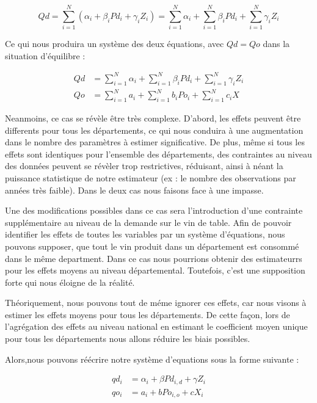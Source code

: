 \documentclass[11pt,]{article}
\begin{document}
\begin{equation*}
    Qd = \sum_{i = 1}^{N} ( \alpha_i + \beta_i Pd_i + \gamma_i Z_i ) = \sum_{i = 1}^{N} \alpha_i + \sum_{i = 1}^{N} \beta_i Pd_i + \sum_{i = 1}^{N} \gamma_i Z_i
\end{equation*}

Ce qui nous produira un système des deux équations, avec \(Qd = Qo\)
dans la situation d'équilibre :

\begin{align*}
    Qd & = \sum_{i = 1}^{N} \alpha_i + \sum_{i = 1}^{N} \beta_i Pd_i + \sum_{i = 1}^{N} \gamma_i Z_i \\
    Qo & = \sum_{i = 1}^{N} a_i + \sum_{i = 1}^{N} b_i Po_i + \sum_{i = 1}^{N} c_i X
\end{align*}

Neanmoins, ce cas se révèle être très complexe. D'abord, les effets
peuvent être differents pour tous les départements, ce qui nous conduira
à une augmentation dans le nombre des paramètres à estimer
significative. De plus, même si tous les effets sont identiques pour
l'ensemble des départements, des contraintes au niveau des données
peuvent se révèler trop restrictives, réduisant, ainsi à néant la
puissance statistique de notre estimateur (ex : le nombre des
observations par années très faible). Dans le deux cas nous faisons face
à une impasse.

Une des modifications possibles dans ce cas sera l'introduction d'une
contrainte supplémentaire au niveau de la demande sur le vin de table.
Afin de pouvoir identifier les effets de toutes les variables par un
système d'équations, nous pouvons supposer, que tout le vin produit dans
un département est consommé dans le même department. Dans ce cas nous
pourrions obtenir des estimateurrs pour les effets moyens au niveau
départemental. Toutefois, c'est une supposition forte qui nous éloigne
de la réalité.

Théoriquement, nous pouvons tout de méme ignorer ces effets, car nous
visons à estimer les effets moyens pour tous les départements. De cette
façon, lors de l'agrégation des effets au niveau national en estimant le
coefficient moyen unique pour tous les départements nous allons réduire
les biais possibles.

Alors,nous pouvons réécrire notre système d'equations sous la forme
suivante :

\begin{align*}
  qd_i & = \alpha_{i} + \beta Pd_{i,d} + \gamma Z_{i} \\
  qo_i & = a_i + b Po_{i,o} + c X_{i} \\ 
\end{align*}
\end{document}
